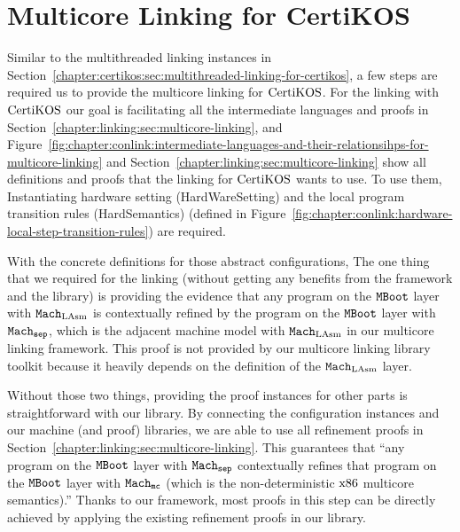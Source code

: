 \section{Multicore Linking for CertiKOS}
\label{chapter:certikos:sec:multicore-linking-for-certikos}

Similar to the multithreaded linking instances in Section~\ref{chapter:certikos:sec:multithreaded-linking-for-certikos}, a few steps are required us to provide the multicore linking for $\mathrm{CertiKOS}$.
For the linking with $\mathrm{CertiKOS}$
our goal is facilitating all the intermediate languages
and proofs in Section~\ref{chapter:linking:sec:multicore-linking},
and
Figure~\ref{fig:chapter:conlink:intermediate-languages-and-their-relationsihps-for-multicore-linking} and 
Section~\ref{chapter:linking:sec:multicore-linking} show all definitions and 
proofs that the linking for $\mathrm{CertiKOS}$ wants to use. 
To use them, 
Instantiating hardware setting (HardWareSetting) and the local program transition rules (HardSemantics) 
(defined in Figure~\ref{fig:chapter:conlink:hardware-local-step-transition-rules})
are required. 

With the concrete definitions for those abstract configurations, 
The one thing that we required for the linking (without getting any benefits from the framework and the library)
is providing the evidence that any program on the ${\mathrm{\texttt{MBoot}}}$ layer with ${\mathrm{\texttt{Mach}}}_{\mathrm{LAsm}}$ is contextually refined by the program on the ${\mathrm{\texttt{MBoot}}}$ layer with ${{\mathrm{\texttt{Mach}}}_{{\mathrm{\texttt{sep}}}}}$, which is the adjacent machine model with ${\mathrm{\texttt{Mach}}}_{\mathrm{LAsm}}$ in our multicore linking framework. This proof is not provided by our multicore linking library toolkit because it heavily depends on the definition of the ${\mathrm{\texttt{Mach}}}_{\mathrm{LAsm}}$ layer.

Without those two things, 
providing the proof instances for other parts is straightforward with our library. 
By connecting the configuration instances and our machine (and proof) libraries, 
we are able to use  all refinement proofs in Section~\ref{chapter:linking:sec:multicore-linking}. 
This guarantees that ``any program on the ${\mathrm{\texttt{MBoot}}}$ layer with ${{\mathrm{\texttt{Mach}}}_{{\mathrm{\texttt{sep}}}}}$ contextually refines that program on the ${\mathrm{\texttt{MBoot}}}$ layer with ${{{\mathrm{\texttt{Mach}}}_{\mathrm{\texttt{mc}}}}}$ (which is the non-deterministic $\mathrm{x86}$ multicore semantics).''
Thanks to our framework, most proofs in this step can be directly achieved by applying the existing refinement proofs in our library.
%
